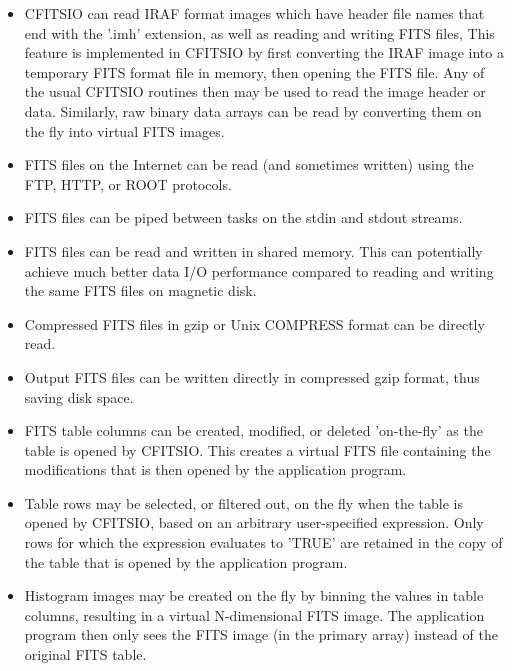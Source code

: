 \documentclass[11pt]{book}
\begin{document}
\begin{itemize}
\item
CFITSIO can read IRAF format images which have header file names that
end with the '.imh' extension, as well as reading and writing FITS
files,   This feature is implemented in CFITSIO by first converting the
IRAF image into a temporary FITS format file in memory, then opening
the FITS file.  Any of the usual CFITSIO routines then may be used to
read the image header or data.  Similarly, raw binary data arrays can
be read by converting them on the fly into virtual FITS images.

\item
FITS files on the Internet can be read (and sometimes written) using the FTP,
HTTP, or ROOT protocols.

\item
FITS files can be piped between tasks on the stdin and stdout streams.

\item
FITS files can be read and written in shared memory.  This can potentially
achieve much better data I/O performance compared to reading and
writing the same FITS files on magnetic disk.

\item
Compressed FITS files in gzip or Unix COMPRESS format can be directly read.

\item
Output FITS files can be written directly in compressed gzip format,
thus saving disk space.

\item
FITS table columns can be created, modified, or deleted 'on-the-fly' as
the table is opened by CFITSIO.  This creates a virtual FITS file containing
the modifications that is then opened by the application program.

\item
Table rows may be selected, or filtered out, on the fly when the table
is opened by CFITSIO, based on an arbitrary user-specified expression.
Only rows for which the expression evaluates to 'TRUE' are retained
in the copy of the table that is opened by the application program.

\item
Histogram images may be created on the fly by binning the values in
table columns, resulting in a virtual N-dimensional FITS image.  The
application program then only sees the FITS image (in the primary
array) instead of the original FITS table.
\end{itemize}
\end{document}
